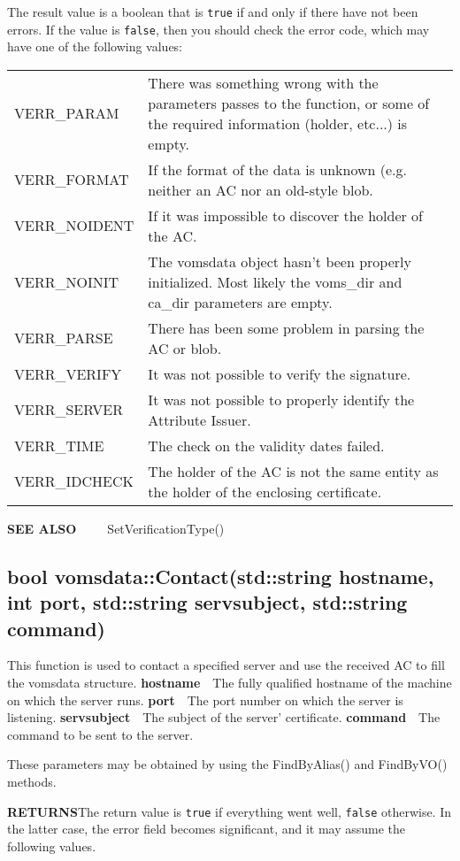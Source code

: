 \documentclass[a4paper]{book}
\newcommand{\also}[1]{\textbf{SEE ALSO}\newline\ \ \ \ \ #1}
\newcommand{\return}{\textbf{RETURNS}\newline}
\newcommand{\parameter}[2]{\newline\textbf{#1}\ \ #2}
\begin{document}
The result value is a boolean that is \texttt{true} if and only if
there have not been errors.  If the value is \texttt{false}, then you
should check the error code, which may have one of the following
values:


\bigskip\begin{tabular}{lp{3in}}
VERR\_PARAM   & There was something wrong with the parameters passes to
the function, or some of the required information (holder, etc...) is
empty.\\ 
VERR\_FORMAT  & If the format of the data is unknown (e.g. neither an
AC nor an old-style blob.\\
VERR\_NOIDENT & If it was impossible to discover the holder of the AC.\\ 
VERR\_NOINIT  & The vomsdata object hasn't been properly initialized.
Most likely the voms\_dir and ca\_dir parameters are empty.\\
VERR\_PARSE   & There has been some problem in parsing the AC or
blob.\\
VERR\_VERIFY  & It was not possible to verify the signature.\\
VERR\_SERVER  & It was not possible to properly identify the Attribute
Issuer.\\
VERR\_TIME    & The check on the validity dates failed.\\
VERR\_IDCHECK & The holder of the AC is not the same entity as the
holder of the enclosing certificate.\\
\end{tabular}

\also{SetVerificationType()}

\subsection{bool vomsdata::Contact(std::string hostname, int port, std::string servsubject, std::string command)}

This function is used to contact a specified server and use the
received AC to fill the vomsdata structure.
\parameter{hostname}{The fully qualified hostname of the machine on which the server runs.}
\parameter{port}{The port number on which the server is listening.}
\parameter{servsubject}{The subject of the server' certificate.}
\parameter{command}{The command to be sent to the server.}

These parameters may be obtained by using the FindByAlias() and
FindByVO() methods.

\return The return value is \texttt{true} if everything went well,
\texttt{false} otherwise.  In the latter case, the error field becomes
significant, and it may assume the following values.
\end{document}
